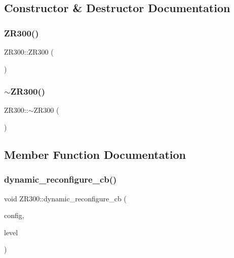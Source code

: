 \subsection{Constructor \& Destructor Documentation}
\mbox{\label{classZR300_a63a89a9de2af2d6d30ecf039b64c48a3}} 
\subsubsection{\texorpdfstring{Z\+R300()}{ZR300()}}
{\footnotesize\ttfamily Z\+R300\+::\+Z\+R300 (\begin{DoxyParamCaption}{ }\end{DoxyParamCaption})}

\mbox{\label{classZR300_af9ecd118c1a33dd2da78693de057c8b5}} 
\subsubsection{\texorpdfstring{$\sim$\+Z\+R300()}{~ZR300()}}
{\footnotesize\ttfamily Z\+R300\+::$\sim$\+Z\+R300 (\begin{DoxyParamCaption}{ }\end{DoxyParamCaption})}



\subsection{Member Function Documentation}
\mbox{\label{classZR300_a562f13a7e98d8b7b58818194d5aa142e}} 
\subsubsection{\texorpdfstring{dynamic\+\_\+reconfigure\+\_\+cb()}{dynamic\_reconfigure\_cb()}}
{\footnotesize\ttfamily void Z\+R300\+::dynamic\+\_\+reconfigure\+\_\+cb (\begin{DoxyParamCaption}\item[{dynamic\+\_\+obstacle\+\_\+tracking\+::zr300\+Config \&}]{config,  }\item[{uint32\+\_\+t}]{level }\end{DoxyParamCaption})\hspace{0.3cm}{\ttfamily [private]}}

